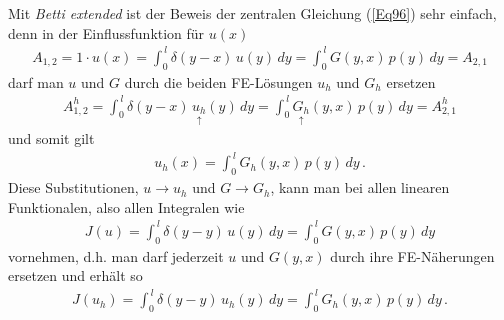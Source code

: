 Mit {\em Betti extended\/} ist der Beweis
der zentralen Gleichung (\ref{Eq96}) sehr einfach, denn in der Einflussfunktion f\"{u}r $u(x)$
\begin{align}
A_{1,2} = 1 \cdot u(x) = \int_0^{\,l} \delta(y-x)\,u(y)\,dy = \int_0^{\,l} G(y,x)\,p(y)\,dy = A_{2,1}
\end{align}
darf man $u$ und $G$ durch die beiden FE-L\"{o}sungen $u_h$ und $G_h$ ersetzen
\begin{align}
A_{1,2}^h = \int_0^{\,l} \delta(y-x)\,\underset{\uparrow}{u_h}(y)\,dy = \int_0^{\,l} \underset{\uparrow}{G_h}(y,x)\,p(y)\,dy = A_{2,1}^h
\end{align}
und somit gilt
\begin{align}
u_h(x) = \int_0^{\,l} G_h(y,x)\,p(y)\,dy \,.
\end{align}
Diese Substitutionen, $u \to u_h$ und $G \to G_h$, kann man bei allen linearen Funktionalen, also allen Integralen wie
\begin{align}\label{Eq47}
J(u) = \int_0^{\,l} \delta(y-y)\,u(y)\,dy = \int_0^{\,l} G(y,x)\,p(y)\,dy
\end{align}
vornehmen, d.h. man darf jederzeit $u$ und $G(y,x)$ durch ihre FE-N\"{a}herungen ersetzen und erh\"{a}lt so
\begin{align}\label{Eq76}
J(u_h) = \int_0^{\,l} \delta(y-y)\,u_h(y)\,dy = \int_0^{\,l} G_h(y,x)\,p(y)\,dy\,.
\end{align}

